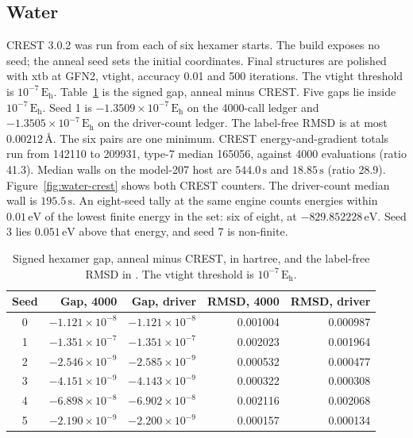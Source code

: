 \documentclass[aip,jcp,preprint,amsmath,amssymb,floatfix]{revtex4-2}
\begin{document}
\subsection{Water}
CREST 3.0.2 was run from each of six hexamer starts.
The build exposes no seed; the anneal seed sets the initial coordinates.
Final structures are polished with xtb at GFN2, vtight, accuracy 0.01 and 500 iterations.
The vtight threshold is \(10^{-7}\,\mathrm{E_h}\).
Table~\ref{tab:gaps} is the signed gap, anneal minus CREST.
Five gaps lie inside \(10^{-7}\,\mathrm{E_h}\).
Seed 1 is \(-1.3509\times 10^{-7}\,\mathrm{E_h}\) on the 4000-call ledger and \(-1.3505\times 10^{-7}\,\mathrm{E_h}\) on the driver-count ledger.
The label-free RMSD is at most \(0.00212\,\text{\AA}\).
The six pairs are one minimum.
CREST energy-and-gradient totals run from 142110 to 209931, type-7 median 165056, against 4000 evaluations (ratio 41.3).
Median walls on the model-207 host are \(544.0\,\mathrm{s}\) and \(18.85\,\mathrm{s}\) (ratio 28.9).
Figure~\ref{fig:water-crest} shows both CREST counters.
The driver-count median wall is \(195.5\,\mathrm{s}\).
An eight-seed tally at the same engine counts energies within \(0.01\,\mathrm{eV}\) of the lowest finite energy in the set: six of eight, at \(-829.852228\,\mathrm{eV}\).
Seed 3 lies \(0.051\,\mathrm{eV}\) above that energy, and seed 7 is non-finite.

\begin{table}
\caption{Signed hexamer gap, anneal minus CREST, in hartree, and the label-free RMSD in \text{\AA}.
The vtight threshold is \(10^{-7}\,\mathrm{E_h}\).}
\label{tab:gaps}
\begin{ruledtabular}
\begin{tabular}{crrrr}
Seed & Gap, 4000 & Gap, driver & RMSD, 4000 & RMSD, driver \\
\hline
0 & \(-1.121\times 10^{-8}\) & \(-1.121\times 10^{-8}\) & 0.001004 & 0.000987 \\
1 & \(-1.351\times 10^{-7}\) & \(-1.351\times 10^{-7}\) & 0.002023 & 0.001964 \\
2 & \(-2.546\times 10^{-9}\) & \(-2.585\times 10^{-9}\) & 0.000532 & 0.000477 \\
3 & \(-4.151\times 10^{-9}\) & \(-4.143\times 10^{-9}\) & 0.000322 & 0.000308 \\
4 & \(-6.898\times 10^{-8}\) & \(-6.902\times 10^{-8}\) & 0.002116 & 0.002068 \\
5 & \(-2.190\times 10^{-9}\) & \(-2.200\times 10^{-9}\) & 0.000157 & 0.000134 \\
\end{tabular}
\end{ruledtabular}
\end{table}
\end{document}
